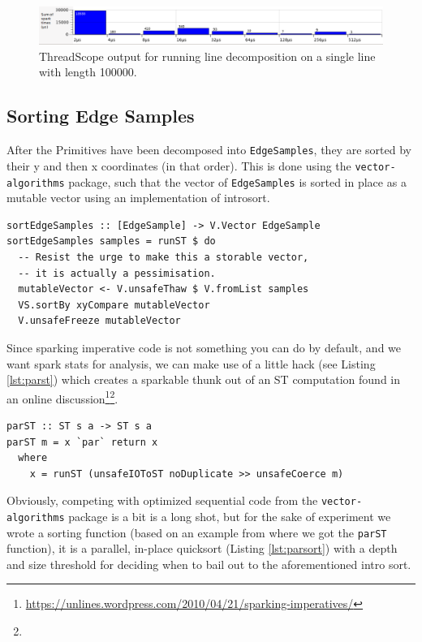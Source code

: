 \documentclass[12pt, a4paper]{article}
\begin{document}
\begin{figure}[h!]
  \centering
  \includegraphics[width=0.85\linewidth]{../threadscope/lines/single-line-every-10-spark-times}
  \caption{ThreadScope output for running line decomposition on a single line with length
    100000.}
  \label{fig:single-line-thread-sparks}
\end{figure}

\subsection{Sorting Edge Samples}

After the Primitives have been decomposed into \texttt{EdgeSamples}, they are sorted by their y and then x coordinates (in that order).
This is done using the \texttt{vector-algorithms} package, such that the vector of \texttt{EdgeSamples} is sorted in place as a mutable vector
 using an implementation of introsort.
\begin{lstlisting}[caption={Sorting the edge samples.}]
sortEdgeSamples :: [EdgeSample] -> V.Vector EdgeSample
sortEdgeSamples samples = runST $ do
  -- Resist the urge to make this a storable vector,
  -- it is actually a pessimisation.
  mutableVector <- V.unsafeThaw $ V.fromList samples
  VS.sortBy xyCompare mutableVector
  V.unsafeFreeze mutableVector
\end{lstlisting}

Since sparking imperative code is not something you can do by default, and we want spark stats for
analysis, we can make use of a little hack (see Listing \ref{lst:parst}) which creates a sparkable
 thunk out of an ST computation found in an online discussion\footnote{\label{note1}\url{https://unlines.wordpress.com/2010/04/21/sparking-imperatives/}}\footnote{}.
\begin{lstlisting}[label={lst:parst}, caption={\texttt{parST}}]
parST :: ST s a -> ST s a
parST m = x `par` return x
  where
    x = runST (unsafeIOToST noDuplicate >> unsafeCoerce m)
\end{lstlisting}
Obviously, competing with optimized sequential code from the \texttt{vector-algorithms} package is a
 bit is a long shot, but for the sake of experiment we wrote a sorting function (based on an example from where we got the \texttt{parST} function),
 it is a parallel, in-place quicksort (Listing \ref{lst:parsort}) with a depth and size threshold for deciding when to bail out to the aforementioned intro sort.
\end{document}

